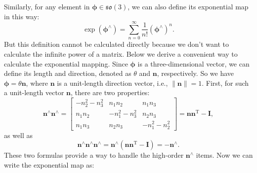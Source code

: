 Similarly, for any element in $\boldsymbol{\phi} \in \mathfrak{so}(3)$, we can also define its exponential map in this way:
\begin{equation}
\exp(\boldsymbol{\phi}^\wedge) = \sum\limits_{n = 0}^\infty {\frac{1}{{n!}}{ (\boldsymbol{\phi}^{\wedge })^n}}.
\end{equation}
But this definition cannot be calculated directly because we don't want to calculate the infinite power of a matrix. Below we derive a convenient way to calculate the exponential mapping. Since $\boldsymbol{\phi}$ is a three-dimensional vector, we can define its length and direction,  denoted as $\theta$ and $\mathbf{n}$, respectively. So we have $\boldsymbol{\phi} = \theta \mathbf{n}$, where $\mathbf{n}$ is a unit-length direction vector, i.e., $\| \mathbf{n} \| =1$. First, for such a unit-length vector $\mathbf{n}$, there are two properties:
\begin{equation}
 \mathbf{n}^{\wedge} \mathbf{n}^{\wedge} = \left[ {\begin{array}{*{20}{c}}
{ - n_2^2 - n_3^2}&{{n_1}{n_2}}&{{n_1}{n_3}}\\
{{n_1}{n_2}}&{ - n_1^2 - n_3^2}&{{n_2}{n_3}}\\
{{n_1}{n_3}}&{{n_2}{n_3}}&{ - n_1^2 - n_2^2}
\end{array}} \right] = \mathbf{n} \mathbf{n}^\mathrm{T} - \mathbf{I},
\end{equation}
as well as
\begin{equation}
\mathbf{n}^{\wedge} \mathbf{n}^{\wedge} \mathbf{n}^{\wedge} = \mathbf{n}^\wedge (\mathbf{n}\mathbf{n} ^\mathrm{T}-\mathbf{I}) = - \mathbf{n}^{\wedge}.
\end{equation}
These two formulas provide a way to handle the high-order $\mathbf{n}^\wedge$ items. Now we can write the exponential map as:

